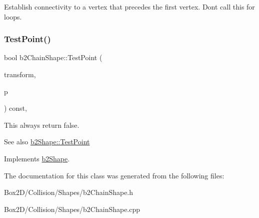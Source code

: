 Establish connectivity to a vertex that precedes the first vertex. Don\textquotesingle{}t call this for loops. \mbox{\label{classb2_chain_shape_afd03c8679f18f9962a6c76bde629c62a}} 
\subsubsection{\texorpdfstring{Test\+Point()}{TestPoint()}}
{\footnotesize\ttfamily bool b2\+Chain\+Shape\+::\+Test\+Point (\begin{DoxyParamCaption}\item[{const \hyperlink{structb2_transform}{b2\+Transform} \&}]{transform,  }\item[{const \hyperlink{structb2_vec2}{b2\+Vec2} \&}]{p }\end{DoxyParamCaption}) const\hspace{0.3cm}{\ttfamily [override]}, {\ttfamily [virtual]}}

This always return false. \begin{DoxySeeAlso}{See also}
\hyperlink{classb2_shape_a6ac968e403e2d93e8ae46d728a2e50fa}{b2\+Shape\+::\+Test\+Point} 
\end{DoxySeeAlso}


Implements \hyperlink{classb2_shape_a6ac968e403e2d93e8ae46d728a2e50fa}{b2\+Shape}.



The documentation for this class was generated from the following files\+:\begin{DoxyCompactItemize}
\item 
Box2\+D/\+Collision/\+Shapes/b2\+Chain\+Shape.\+h\item 
Box2\+D/\+Collision/\+Shapes/b2\+Chain\+Shape.\+cpp\end{DoxyCompactItemize}

